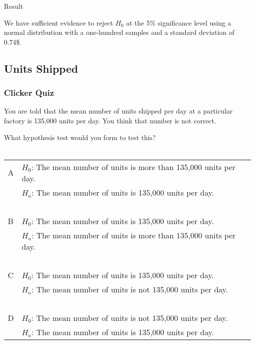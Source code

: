 \begin{frame}{Result}

  We have sufficient evidence to reject $H_0$ at the 5\% significance
  level using a normal distribution with a one-hundred samples and a
  standard deviation of 0.74\$.
  
\end{frame}


\subsection{Units Shipped}
\begin{frame}
  \frametitle{Clicker Quiz}

  You are told that the mean number of units shipped per day at a
  particular factory is 135,000 units per day. You think that number
  is not correct.

  What hypothesis test would you form to test this? \\
  ~ \\
  \begin{tabular}{ll@{\hspace{3em}}l}
    A & $H_0$: The mean number of units is more than 135,000 units per day. \\
      & $H_a$: The mean number of units is 135,000 units per day. \\
    ~ \\
    B & $H_0$: The mean number of units is 135,000 units per day. \\
      & $H_a$: The mean number of units is more than 135,000 units per day. \\
    ~ \\
    C & $H_0$: The mean number of units is 135,000 units per day.  \\
      & $H_a$: The mean number of units is not 135,000 units per day. \\
    ~ \\
    D & $H_0$: The mean number of units is not 135,000 units per day.  \\
      & $H_a$: The mean number of units is 135,000 units per day.

  \end{tabular}

\end{frame}


